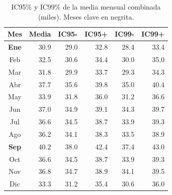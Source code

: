 \documentclass[12pt,a4paper]{article}
\begin{document}
\begin{table}[H]
  \centering
  \small
  \begin{tabular}{c rrrrr}
    \toprule
    Mes & Media & IC95- & IC95+ & IC99- & IC99+\\
    \midrule
    \textbf{Ene} & 30.9 & 29.0 & 32.8 & 28.4 & 33.4\\
    Feb & 32.5 & 30.6 & 34.4 & 30.0 & 35.0\\
    Mar & 31.8 & 29.9 & 33.7 & 29.3 & 34.3\\
    Abr & 37.7 & 35.6 & 39.8 & 35.0 & 40.4\\
    May & 33.9 & 31.8 & 36.0 & 31.2 & 36.6\\
    Jun & 37.0 & 34.9 & 39.1 & 34.3 & 39.7\\
    Jul & 36.6 & 34.5 & 38.7 & 33.9 & 39.3\\
    Ago & 36.2 & 34.1 & 38.3 & 33.5 & 38.9\\
    \textbf{Sep} & 40.2 & 38.0 & 42.4 & 37.4 & 43.0\\
    Oct & 36.6 & 34.5 & 38.7 & 33.9 & 39.3\\
    Nov & 36.8 & 34.7 & 38.9 & 34.1 & 39.5\\
    Dic & 33.3 & 31.2 & 35.4 & 30.6 & 36.0\\
    \bottomrule
  \end{tabular}
  \caption{IC95\% y IC99\% de la media mensual combinada (miles). Meses clave en negrita.}
\end{table}
\end{document}
